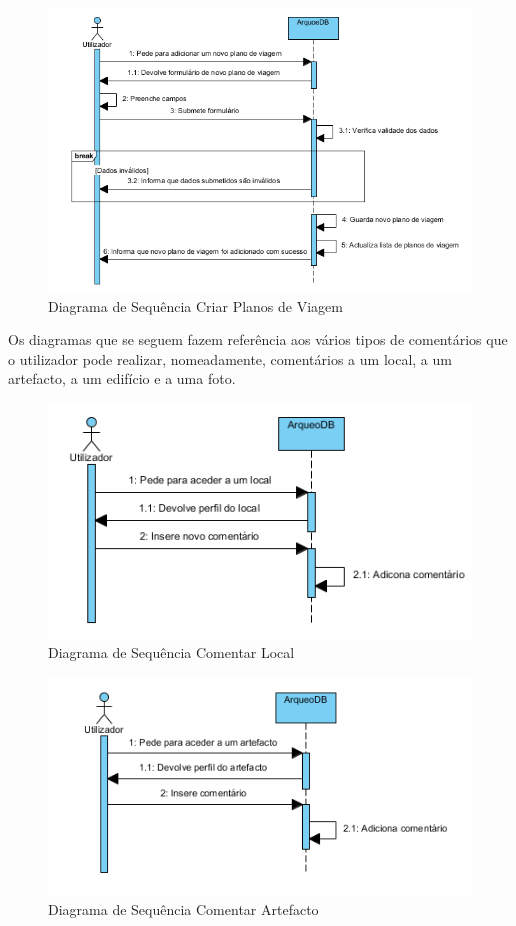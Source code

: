 ﻿\documentclass[12pt,a4paper]{article}
\begin{document}
\begin{figure}[h!]
\centering
\includegraphics[scale=0.8]{sequencia/criarviagem}
\caption{Diagrama de Sequência Criar Planos de Viagem} 
\end{figure}

\clearpage
Os diagramas que se seguem fazem referência aos vários tipos de comentários que o utilizador pode realizar, nomeadamente, comentários a um local, a um artefacto, a um edifício e a uma foto.\\

\begin{figure}[h!]
\centering
\includegraphics[scale=1]{sequencia/comentarlocal}
\caption{Diagrama de Sequência Comentar Local} 
\end{figure}


\begin{figure}[h!]
\centering
\includegraphics[scale=1]{sequencia/comentarartefacto}
\caption{Diagrama de Sequência Comentar Artefacto} 
\end{figure}
\end{document}

